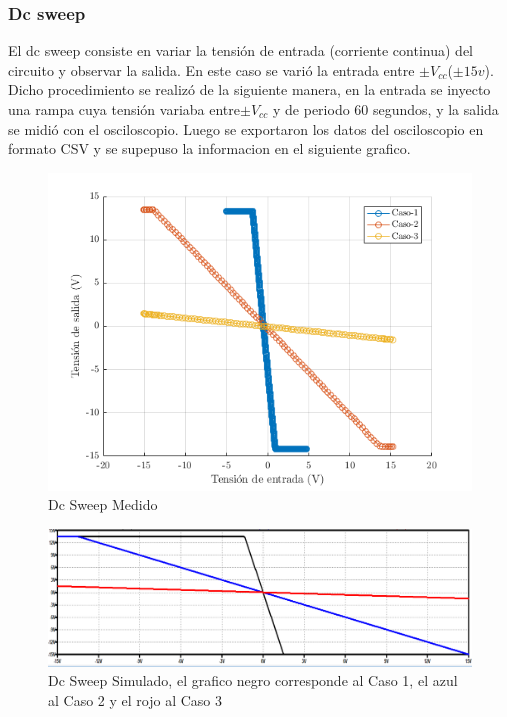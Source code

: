 \documentclass[../../main.tex]{subfiles}
\begin{document}
\subsubsection{Dc sweep}
El dc sweep consiste en variar la tensión de entrada (corriente continua) del circuito y observar la salida. En este caso se varió la entrada entre $\pm V_{cc}$($\pm 15 v$). Dicho procedimiento se realizó de la siguiente manera, en la entrada se inyecto una rampa  cuya  tensión variaba entre$\pm V_{cc}$ y de periodo 60 segundos, y la salida se midió con el osciloscopio. Luego se exportaron los datos del osciloscopio en formato CSV y se supepuso la informacion en el siguiente grafico.

\begin{figure}[H]
\centering
\includegraphics[width=1\textwidth]{imagenes/dc_sweep_inv.png}
\caption{Dc Sweep Medido} \label{fig=dcInv}
\end{figure}

\begin{figure}[H]
\centering
\includegraphics[width=1.1\textwidth]{imagenes/dc_sweep_inv_sim.png}
\caption{Dc Sweep Simulado, el grafico negro corresponde al Caso 1, el azul al Caso 2 y el rojo al Caso 3} \label{fig=dcInvSim}
\end{figure}
\end{document}

